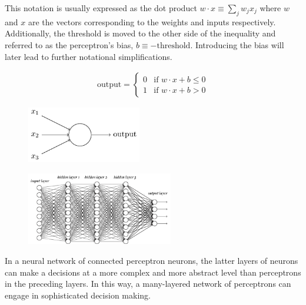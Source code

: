\documentclass[12pt]{article}
\begin{document}
\noindent
This notation is usually expressed as the dot product $w \cdot x \equiv \sum_j w_j x_j$ where $w$ and $x$ are the vectors corresponding to the weights and inputs respectively. Additionally, the threshold is moved to the other side of the inequality and referred to as the perceptron's bias, $b \equiv -\mbox{threshold}$. Introducing the bias will later lead to further notational simplifications.

\begin{eqnarray}
  \mbox{output} = \left\{ 
    \begin{array}{ll} 
      0 & \mbox{if } w\cdot x + b \leq 0 \\
      1 & \mbox{if } w\cdot x + b > 0
    \end{array}
  \right.
\end{eqnarray}

\newpage
\noindent

\begin{figure}
\centering
\begin{minipage}{.5\textwidth}
  \centering
  \includegraphics[width=5cm]{perceptron1.png}
  \label{fig:test1}
\end{minipage}%
\begin{minipage}{.5\textwidth}
  \centering
  \includegraphics[width=6.4cm]{neural-net-layers.png}
  \label{fig:test2}
\end{minipage}
\end{figure}

\noindent
In a neural network of connected perceptron neurons, the latter layers of neurons can make a decisions at a more complex and more abstract level than perceptrons in the preceding layers. In this way, a many-layered network of perceptrons can engage in sophisticated decision making.
\\
\end{document}
